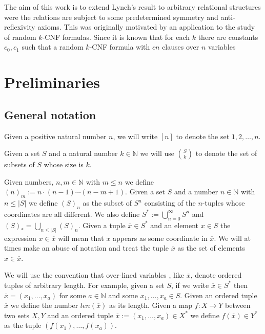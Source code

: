 \documentclass[12pt,notitlepage,a4paper]{article}
\theoremstyle{definition}
\newcommand{\N}{\mathbb{N}}
\begin{document}
The aim of this work is to extend Lynch's result to arbitrary 
relational structures were the relations are subject to some
predetermined symmetry and anti-reflexivity axioms. This was 
originally motivated by an application to the study of random
$k$-CNF formulas. Since \cite{chvatal1992mick} it is known that 
for each $k$ there are constants $c_0,c_1$ such that a random 
$k$-CNF formula with $cn$ clauses over $n$ variables 

% 





\setcounter{section}{0}

\section{Preliminaries}

\subsection{General notation}\label{subsect:notation}

Given a positive natural number $n$, we will write
$[n]$ to denote the set ${1,2,\dots,n}$.\par
Given a set $S$ and a natural number $k\in \N$
we will use $\binom{S}{k}$ to denote the set of 
subsets of $S$ whose size is $k$. \par
Given numbers, $n,m\in \N$ with $m\leq n$ we define
$(n)_m:=n\cdot (n-1)\cdots (n-m+1)$. Given a set
$S$ and a number $n\in \N$ with $n\leq |S|$ we define
$(S)_n$ as the subset of $S^n$ consisting of the $n$-tuples
whose coordinates are all different. 
We also define $S^*:=\bigcup_{n=0}^\infty S^n$ and
$(S)_*=\bigcup_{n\leq |S|} (S)_n$. Given a tuple 
$\overline{x}\in S^*$ and an element $x\in S$ the expression
$x\in \overline{x}$ will mean that $x$ appears as some coordinate
in $\overline{x}$. We will at times make an abuse of notation and
treat the tuple $\overline{x}$
as the set of elements $x\in \overline{x}$. \par
We will use the convention that over-lined variables
, like $\overline{x}$, denote ordered tuples of arbitrary length. 
For example, given a set $S$, if we write $\overline{x}\in S^*$
then $\overline{x}=(x_1,\dots, x_a)$ for some $a\in \N$ and 
some $x_1,\dots, x_a\in S$. Given an ordered tuple $\overline{x}$
we define the number $len(\overline{x})$ as its length. 
Given a map $f:X\rightarrow Y$ between two sets $X, Y$ and 
an ordered tuple $\overline{x}:=(x_1,\dots,x_a)\in X^*$ 
we define $f(\overline{x})\in Y^*$ as the tuple 
$(f(x_1),\dots,f(x_a))$.
\par
\end{document}
